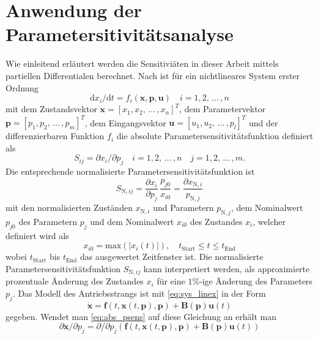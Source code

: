 \section{Anwendung der Parametersitivitätsanalyse}\label{sec:para_sens}
Wie einleitend erläutert werden die Sensitiviäten in dieser Arbeit mittels partiellen Differentialen berechnet. Nach \cite{Hearne.1985} ist für ein nichtlineares System erster Ordnung
\begin{equation}
\mathrm{d} x_i/\mathrm{d} t = f_i(\pmb{x},\pmb{p},\pmb{u})\quad i=1,2,\,\dots\, ,n 
\end{equation}
mit dem Zustandsvektor $\pmb{x} = [x_1, x_2,\, \dots\, ,x_n]^T$, dem Parametervektor $\pmb{p} = [p_1, p_2,\, \dots\, ,p_m]^T$, dem Eingangsvektor $\pmb{u} = [u_1, u_2,\, \dots\, ,p_l]^T$ und der differenzierbaren Funktion $f_i$ die absolute Parametersensitivitätsfunktion definiert als
\begin{equation}\label{eq:abs_psens}
S_{ij} = \partial x_i/\partial p_j \quad i=1,2,\,\dots\, ,n \quad j=1,2,\,\dots\, ,m.
\end{equation}
Die entsprechende normalisierte Parametersensitivitätsfunktion ist 
\begin{equation}
S_{\mathrm{N},ij} = \frac{\partial x_i}{\partial p_j}\, \frac{p_{j0}}{x_{i0}} = \frac{\partial x_{\mathrm{N},i}}{p_{\mathrm{N},j}}
\end{equation}
mit den normalisierten Zuständen $x_{\mathrm{N},i}$ und Parametern $p_{\mathrm{N},j}$, dem Nominalwert $p_{j0}$ des Parametern $p_{j}$ und dem Nominalwert $x_{i0}$ des  Zustandes $x_{i}$, welcher definiert wird als
\begin{equation}
 x_{i0} = \mathrm{max}\left( \left|x_{i}(t)\right|\right),\quad t_\mathrm{Start}\leq t \leq t_\mathrm{End}
\end{equation}
wobei $t_\mathrm{Start}$ bis $t_\mathrm{End}$ das ausgewertet Zeitfenster ist.
Die normalisierte Parametersensitivitätsfunktion $S_{\mathrm{N},ij}$ kann interpretiert werden, als approximierte prozentuale Änderung des Zustandes $x_i$ für eine $1\%$-ige Änderung des Parameters $p_j$. Das Modell des Antriebsstrangs ist mit \eqref{eq:sys_linex} in der Form
\begin{equation}
\dot{\pmb{x}} = \pmb{f}(t,\pmb{x}(t,\pmb{p}),\pmb{p})+ \pmb{B}(\pmb{p})\pmb{u}(t) 
\end{equation} 
gegeben. Wendet man \eqref{eq:abs_psens} auf diese Gleichung an erhält man
\begin{equation}\label{eq:Sens_eq1}
\partial\dot{\pmb{x}}/\partial p_j = \partial/\partial p_j\left(\pmb{f}(t,\pmb{x}(t,\pmb{p}),\pmb{p})+ \pmb{B}(\pmb{p})\pmb{u}(t)\right)
\end{equation}
